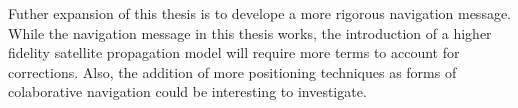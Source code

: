 \documentclass[12pt]{report}
\begin{document}
Futher expansion of this thesis is to develope a more rigorous navigation message. While the navigation message in this thesis works, the introduction of a higher fidelity satellite propagation model will require more terms to account for corrections. Also, the addition of more positioning techniques as forms of colaborative navigation could be interesting to investigate. 




%









\end{document}
